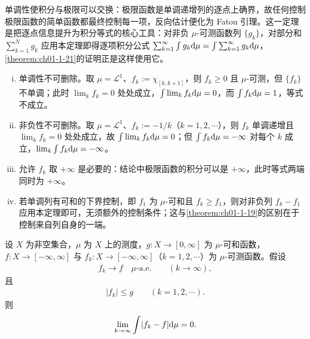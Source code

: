 \documentclass[../../main.tex]{subfiles}%
\begin{document}
\begin{remark}\label{remark:ch01-thm-1-18-动机}
单调性使积分与极限可以交换：极限函数是单调递增列的逐点上确界，故任何控制极限函数的简单函数都最终控制每一项，反向估计便化为 Fatou 引理。这一定理是把逐点信息提升为积分等式的核心工具：对非负 $\mu$-可测函数列 $\{g_k\}$，对部分和 $\sum_{k=1}^{N}g_k$ 应用本定理即得逐项积分公式 $\sum_{k=1}^{\infty}\int g_k\mathrm{d}\mu=\int\sum_{k=1}^{\infty}g_k\mathrm{d}\mu$，\cref{theorem:ch01-1-21}的证明正是这样使用它。%
\end{remark}

\begin{remark}\label{remark:ch01-thm-1-18-条件}
\begin{enumerate}[(i)]
\item 单调性不可删除。取 $\mu=\mathcal{L}^1$、$f_k:=\chi_{[k,k+1]}$，则 $f_k\geqslant0$ 且 $\mu$-可测，但 $\{f_k\}$ 不单调；此时 $\lim_{k}f_k=0$ 处处成立，$\int\lim_{k}f_k\mathrm{d}\mu=0$，而 $\int f_k\mathrm{d}\mu=1$，等式不成立。
\item 非负性不可删除。取 $\mu=\mathcal{L}^1$、$f_k:=-1/k$（$k=1,2,\cdots$），则 $f_k$ 单调递增且 $\lim_{k}f_k=0$ 处处成立，故 $\int\lim_{k}f_k\mathrm{d}\mu=0$；但 $\int f_k\mathrm{d}\mu=-\infty$ 对每个 $k$ 成立，$\lim_{k}\int f_k\mathrm{d}\mu=-\infty$。
\item 允许 $f_k$ 取 $+\infty$ 是必要的：结论中极限函数的积分可以是 $+\infty$，此时等式两端同时为 $+\infty$。
\item 若单调列有可和的下界控制，即 $f_1$ 为 $\mu$-可和且 $f_k\geqslant f_1$，则对非负列 $f_k-f_1$ 应用本定理即可，无须额外的控制条件；这与\cref{theorem:ch01-1-19}的区别在于控制来自列自身的一端。%
\end{enumerate}
\end{remark}

\begin{theorem}[控制收敛定理]\label{theorem:ch01-1-19}
设 $X$ 为非空集合，$\mu$ 为 $X$ 上的测度，$g:X\to[0,\infty]$ 为 $\mu$-可和函数，$f:X\to[-\infty,\infty]$ 与 $f_k:X\to[-\infty,\infty]$（$k=1,2,\cdots$）为 $\mu$-可测函数。假设
\begin{align*}
f_k\to f\quad\mu\text{-a.e.}\qquad(k\to\infty),
\end{align*}
且
\begin{align*}
\lvert f_k\rvert\leqslant g\qquad(k=1,2,\cdots).
\end{align*}
则
\begin{align}
\lim_{k\to\infty}\int\lvert f_k-f\rvert\mathrm{d}\mu=0 .\label{align:ch01-1-19-dct}
\end{align}
\end{theorem}
\end{document}
